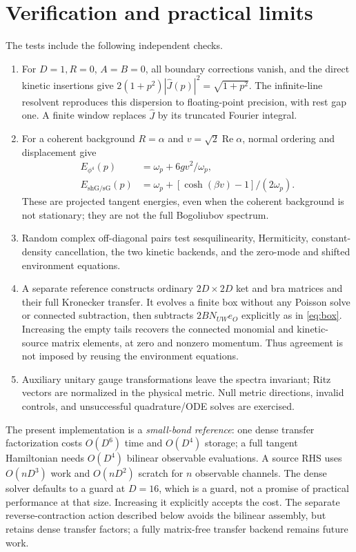 \documentclass[11pt]{article}
\begin{document}
\section{Verification and practical limits}
The tests include the following independent checks.
\begin{enumerate}
\item For $D=1,R=0$, $A=B=0$, all boundary corrections vanish, and the direct
kinetic insertions give
$2(1+p^2)|\widehat J(p)|^2=\sqrt{1+p^2}$.
The infinite-line resolvent reproduces this dispersion to floating-point
precision, with rest gap one. A finite window replaces $\widehat J$ by its
truncated Fourier integral.
\item For a coherent background $R=\alpha$ and
$v=\sqrt2\operatorname{Re}\alpha$, normal ordering and displacement give
\begin{align}
 E_{\phi^4}(p)&=\omega_p+6gv^2/\omega_p,\\
 E_{\mathrm{shG/sG}}(p)&=\omega_p+
                  [\cosh(\beta v)-1]/(2\omega_p).
\end{align}
These are projected tangent energies, even when the coherent background is
not stationary; they are not the full Bogoliubov spectrum.
\item Random complex off-diagonal pairs test sesquilinearity, Hermiticity,
constant-density cancellation, the two kinetic backends, and the zero-mode
and shifted environment equations.
\item A separate reference constructs ordinary $2D\times2D$ ket and bra
matrices and their full Kronecker transfer. It evolves a finite box without
any Poisson solve or connected subtraction, then subtracts $2BN_{UW}e_O$
explicitly as in \eqref{eq:box}. Increasing the empty tails recovers the
connected monomial and kinetic-source matrix elements, at zero and nonzero
momentum. Thus agreement is not imposed by reusing the environment equations.
\item Auxiliary unitary gauge transformations leave the spectra invariant;
Ritz vectors are normalized in the physical metric. Null metric directions,
invalid controls, and unsuccessful quadrature/ODE solves are exercised.
\end{enumerate}

The present implementation is a \emph{small-bond reference}:
one dense transfer factorization costs $O(D^6)$ time and $O(D^4)$ storage;
a full tangent Hamiltonian needs $O(D^4)$ bilinear observable evaluations.
A source RHS uses $O(nD^3)$ work and $O(nD^2)$ scratch for $n$ observable
channels. The dense solver defaults to a guard at $D=16$, which is a guard,
not a promise of practical performance at that size. Increasing it explicitly
accepts the cost. The separate reverse-contraction action described below avoids the
bilinear assembly, but retains dense transfer factors; a fully matrix-free
transfer backend remains future work.
\end{document}
